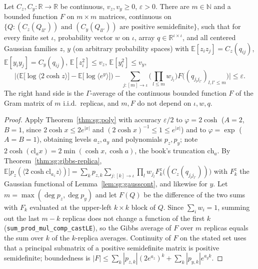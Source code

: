\begin{theorem}\label{thm:sg:gram13}
  \leanok
Let $C_z,C_y:\mathbb R\to\mathbb R$ be continuous, $v_z,v_y\ge0$, $\varepsilon>0$. There are $m\in\mathbb N$ and a bounded function $F$ on $m\times m$ matrices, continuous
on $\{Q:(C_z(Q_{ll'}))\text{ and }(C_y(Q_{ll'}))\text{ are positive semidefinite}\}$, such that for every finite set $\iota$, probability vector $w$ on $\iota$,
array $q\in\mathbb R^{\iota\times\iota}$, and all centered Gaussian families $z$, $y$ (on arbitrary probability spaces) with $\mathbb E[z_iz_j]=C_z(q_{ij})$,
$\mathbb E[y_iy_j]=C_y(q_{ij})$, $\mathbb E[z_i^2]\le v_z$, $\mathbb E[y_i^2]\le v_y$,
\[\Big|\Big(\mathbb E\big[\log\langle2\cosh z\rangle\big]-\mathbb E\big[\log\langle e^{y}\rangle\big]\Big)-\sum_{j:[m]\to\iota}\Big(\prod_{l\le m}w_{j_l}\Big)F\big((q_{j_lj_{l'}})_{l,l'\le m}\big)\Big|\le\varepsilon.\]
The right hand side is the $\Gamma$-average of the continuous bounded function $F$ of the Gram matrix of $m$ i.i.d.\ replicas, and $m,F$ do not depend on $\iota,w,q$.
\end{theorem}

\begin{proof}
  \leanok
Apply Theorem~\ref{thm:sg:poly} with accuracy $\varepsilon/2$ to $\varphi=2\cosh$ ($A=2$, $B=1$, since $2\cosh x\le2e^{|x|}$ and $(2\cosh x)^{-1}\le1\le e^{|x|}$) and to $\varphi=\exp$
($A=B=1$), obtaining levels $a_z,a_y$ and polynomials $p_z,p_y$; note $2\cosh(\mathrm{cl}_ax)=2\min(\cosh x,\cosh a)$, the book's truncation $\mathrm{ch}_a$. By
Theorem~\ref{thm:sg:gibbs-replica}, $\mathbb E\big[p_z(\langle 2\cosh\mathrm{cl}_{a_z}z\rangle)\big]=\sum_k p_{z,k}\sum_{j:[k]\to\iota}\prod_lw_{j_l}F^z_k\big((C_z(q_{j_lj_{l'}}))\big)$
with $F^z_k$ the Gaussian functional of Lemma~\ref{lem:sg:gausscont}, and likewise for $y$. Let $m=\max(\deg p_z,\deg p_y)$ and let $F(Q)$ be the difference of the
two sums with $F^\cdot_k$ evaluated at the upper-left $k\times k$ block of $Q$. Since $\sum_iw_i=1$, summing out the last $m-k$ replicas does not change a function of the first $k$
(\texttt{sum\_prod\_mul\_comp\_castLE}), so the Gibbs average of $F$ over $m$ replicas equals the sum over $k$ of the $k$-replica averages. Continuity of $F$ on the stated set
uses that a principal submatrix of a positive semidefinite matrix is positive semidefinite; boundedness is $|F|\le\sum_k|p_{z,k}|(2e^{a_z})^k+\sum_k|p_{y,k}|e^{a_yk}$.
\end{proof}

